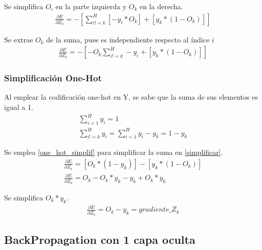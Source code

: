 Se simplifica $O_i$ en la parte izquierda y $O_k$ en la derecha. \\
\begin{gather}
	\frac{\partial E}{\partial Z_k} = - [\sum_{i!=k}^{H} [- y_i * O_k] + [y_k * (1 - O_k) ] ] 
\end{gather}

Se extrae $O_k$ de la suma, pues es independiente respecto al índice $i$ \\
\begin{gather}	
	\frac{\partial E}{\partial Z_k} = - [-O_k \sum_{i!=k}^{H}- y_i + [y_k * (1 - O_k) ] ]
	\label{simplificar}
\end{gather}

\subsubsection{Simplificación One-Hot}

Al emplear la codificación one-hot en Y, se sabe que la suma de sus elementos es igual a 1. \\
\begin{gather}
	\sum_{i=1}^{H} y_i = 1 \\
	\sum_{i!=k}^{H} y_i = \sum_{i=1}^{H} y_i - y_k = 1 - y_k
	\label{one_hot_simplif}
\end{gather}

Se emplea \ref{one_hot_simplif} para simplificar la suma en \ref{simplificar}. \\


\begin{gather}
	\frac{\partial E}{\partial Z_k} = [O_k*(1-y_k)] - [y_k*(1-O_k)] \\
	\frac{\partial E}{\partial Z_k} = O_k - O_k * y_k - y_k + O_k * y_k 
\end{gather}

Se simplifica $O_k*y_k$. \\
\begin{gather}
	\frac{\partial E}{\partial Z_k} = O_k - y_k = gradiente\_Z_k
	\label{gradiente_softmax}
\end{gather}

\subsection{BackPropagation con 1 capa oculta \cite{NN_backpropagation} \cite{NN_backprop_2} \label{backprop_1_capa}}

